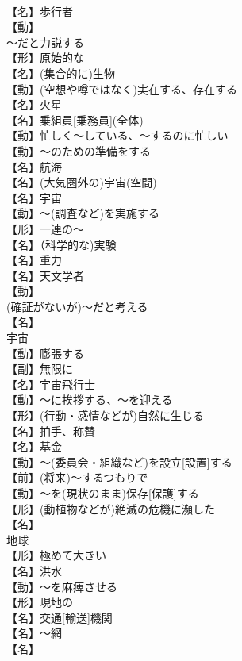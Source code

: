 \documentclass[8pt]{extreport}
\begin{document}
\begin{CJK}{UTF8}{min}
\\	【名】歩行者
\\	【動】
\\	～だと力説する
\\	【形】原始的な
\\	【名】(集合的に)生物
\\	【動】(空想や噂ではなく)実在する、存在する
\\	【名】火星
\\	【名】乗組員[乗務員](全体)
\\	【動】忙しく～している、～するのに忙しい
\\	【動】～のための準備をする
\\	【名】航海
\\	【名】(大気圏外の)宇宙(空間)
\\	【名】宇宙
\\	【動】～(調査など)を実施する
\\	【形】一連の～
\\	【名】（科学的な)実験
\\	【名】重力
\\	【名】天文学者
\\	【動】
\\	(確証がないが)～だと考える
\\	【名】
\\	宇宙
\\	【動】膨張する
\\	【副】無限に
\\	【名】宇宙飛行士
\\	【動】～に挨拶する、～を迎える
\\	【形】(行動・感情などが)自然に生じる
\\	【名】拍手、称賛
\\	【名】基金
\\	【動】～(委員会・組織など)を設立[設置]する
\\	【前】(将来)～するつもりで
\\	【動】～を(現状のまま)保存[保護]する
\\	【形】(動植物などが)絶滅の危機に瀕した
\\	【名】
\\	地球
\\	【形】極めて大きい
\\	【名】洪水
\\	【動】～を麻痺させる
\\	【形】現地の
\\	【名】交通[輸送]機関
\\	【名】～網
\\	【名】

\end{CJK}
\end{document}
